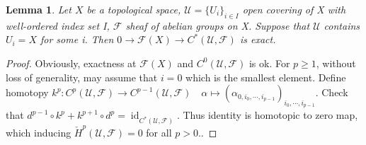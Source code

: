 \documentclass{ctexart}
\newtheorem{lemma}{Lemma}[section]
\newcommand{\identity}{\operatorname{id}}
\begin{document}
\begin{lemma}
    Let $X$ be a topological space, $\mathcal{U} = \{U_{i}\}_{i\in I}$ open covering of X with well-ordered index set I, $\mathcal{F}$ sheaf of abelian groups on X.
    Suppose that $\mathcal{U}$ contains $U_{i} = X$ for some i.
    Then $0 \longrightarrow \mathcal{F}(X) \longrightarrow C^{\ast}(\mathcal{U}, \mathcal{F})$ is exact.
    \label{Lemma 7.5}
\end{lemma}
\begin{proof}
    Obviously, exactness at $\mathcal{F}(X)$ and $C^{0}(\mathcal{U}, \mathcal{F})$ is ok.
    For $p \ge 1$, without loss of generality, may assume that $i = 0$ which is the smallest element.
    Define homotopy $k^{p}: C^{p}(\mathcal{U}, \mathcal{F}) \longrightarrow C^{p - 1}(\mathcal{U}, \mathcal{F})\quad \alpha \longmapsto (\alpha_{0, i_{0}, \cdots, i_{p - 1}})_{i_{0}, \cdots, i_{p - 1}}$.
    Check that $d^{p - 1} \circ k^{p} + k^{p + 1} \circ d^{p} = \identity_{C^{\ast}(\mathcal{U}, \mathcal{F})}$.
    Thus identity is homotopic to zero map, which inducing $\check{H}^{p}(\mathcal{U}, \mathcal{F}) = 0$ for all $p > 0$.. 
\end{proof}
\end{document}
